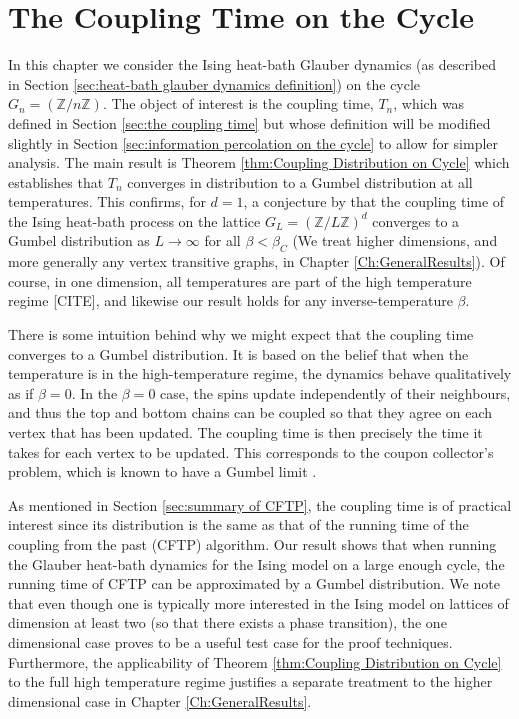 \chapter{The Coupling Time on the Cycle}
\label{Ch:1D}


	In this chapter we consider the Ising heat-bath Glauber dynamics (as described in Section \ref{sec:heat-bath glauber dynamics definition}) on the cycle $G_n = (\mathbb{Z}/n\mathbb{Z})$. The object of interest is the coupling time, $T_n$, which was defined in Section \ref{sec:the coupling time} but whose definition will be modified slightly in Section \ref{sec:information percolation on the cycle} to allow for simpler analysis. The main result is Theorem \ref{thm:Coupling Distribution on Cycle} which establishes that $T_n$ converges in distribution to a Gumbel distribution at all temperatures. This confirms, for $d = 1$, a conjecture by \citeauthor{Collevecchio2017-nq} that the coupling time of the Ising heat-bath process on the lattice $G_L = (\mathbb{Z}/L\mathbb{Z})^d$ converges to a Gumbel distribution as $L \rightarrow \infty$ for all $\beta < \beta_C$ \cite[Conjecture 7.1]{Collevecchio2017-nq} (We treat higher dimensions, and more generally any vertex transitive graphs, in Chapter \ref{Ch:GeneralResults}). Of course, in one dimension, all temperatures are part of the high temperature regime [CITE], and likewise our result holds for any inverse-temperature $\beta$.

	There is some intuition behind why we might expect that the coupling time converges to a Gumbel distribution. It is based on the belief that when the temperature is in the high-temperature regime, the dynamics behave qualitatively as if $\beta = 0$. In the $\beta = 0$ case, the spins update independently of their neighbours, and thus the top and bottom chains can be coupled so that they agree on each vertex that has been updated. The coupling time is then precisely the time it takes for each vertex to be updated. This corresponds to the coupon collector's problem, which is known to have a Gumbel limit \cite{Erdos1961-ti}.

	As mentioned in Section \ref{sec:summary of CFTP}, the coupling time is of practical interest since its distribution is the same as that of the running time of the coupling from the past (CFTP) algorithm. Our result shows that when running the Glauber heat-bath dynamics for the Ising model on a large enough cycle, the running time of CFTP can be approximated by a Gumbel distribution. We note that even though one is typically more interested in the Ising model on lattices of dimension at least two (so that there exists a phase transition), the one dimensional case proves to be a useful test case for the proof techniques. Furthermore, the applicability of Theorem \ref{thm:Coupling Distribution on Cycle} to the full high temperature regime justifies a separate treatment to the higher dimensional case in Chapter \ref{Ch:GeneralResults}.

